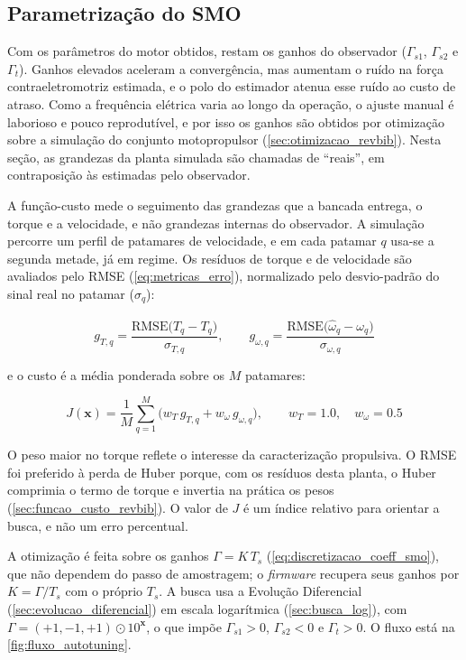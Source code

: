 \subsection{Parametrização do SMO}
\label{sec:param_smo}

Com os parâmetros do motor obtidos, restam os ganhos do observador
($\Gamma_{s1}$, $\Gamma_{s2}$ e $\Gamma_t$). Ganhos elevados aceleram a
convergência, mas aumentam o ruído na força contraeletromotriz estimada, e o
polo do estimador atenua esse ruído ao custo de atraso. Como a frequência
elétrica varia ao longo da operação, o ajuste manual é laborioso e pouco
reprodutível, e por isso os ganhos são obtidos por otimização sobre a
simulação do conjunto motopropulsor (\autoref{sec:otimizacao_revbib}). Nesta
seção, as grandezas da planta simulada são chamadas de ``reais'', em
contraposição às estimadas pelo observador.

A função-custo mede o seguimento das grandezas que a bancada entrega, o torque
e a velocidade, e não grandezas internas do observador. A simulação percorre
um perfil de patamares de velocidade, e em cada patamar $q$ usa-se a segunda
metade, já em regime. Os resíduos de torque e de velocidade são avaliados pelo
RMSE (\autoref{eq:metricas_erro}), normalizado pelo desvio-padrão do sinal
real no patamar ($\sigma_q$):

\begin{equation}
    g_{T,q} = \frac{\mathrm{RMSE}\big(\hat{T}_{q} - T_{q}\big)}{\sigma_{T,q}},
    \qquad
    g_{\omega,q} = \frac{\mathrm{RMSE}\big(\hat{\omega}_{q} - \omega_{q}\big)}{\sigma_{\omega,q}}
    \label{eq:termos_seguimento}
\end{equation}

\noindent e o custo é a média ponderada sobre os $M$ patamares:

\begin{equation}
    J(\mathbf{x}) = \frac{1}{M}\sum_{q=1}^{M}
        \Big( w_T\,g_{T,q} + w_\omega\,g_{\omega,q}\Big),
    \qquad w_T = \num{1,0}, \quad w_\omega = \num{0,5}
    \label{eq:custo_autotuning}
\end{equation}

\noindent O peso maior no torque reflete o interesse da caracterização
propulsiva. O RMSE foi preferido à perda de Huber porque, com os resíduos
desta planta, o Huber comprimia o termo de torque e invertia na prática os
pesos (\autoref{sec:funcao_custo_revbib}). O valor de $J$ é um índice relativo
para orientar a busca, e não um erro percentual.

A otimização é feita sobre os ganhos $\Gamma = K\,T_s$
(\autoref{eq:discretizacao_coeff_smo}), que não dependem do passo de
amostragem; o \textit{firmware} recupera seus ganhos por $K = \Gamma/T_s$ com o
próprio $T_s$. A busca usa a Evolução Diferencial
(\autoref{sec:evolucao_diferencial}) em escala logarítmica
(\autoref{sec:busca_log}), com $\Gamma = (+1,-1,+1)\odot 10^{\mathbf{x}}$, o
que impõe $\Gamma_{s1}>0$, $\Gamma_{s2}<0$ e $\Gamma_t>0$. O fluxo está na
\autoref{fig:fluxo_autotuning}.

